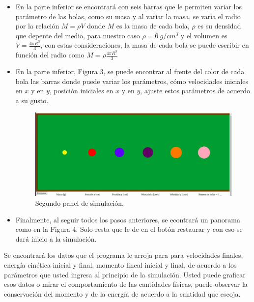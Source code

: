 \documentclass{article}
\begin{document}
\begin{itemize}
   
    \item En la parte inferior se encontrará con seis barras que le permiten variar los parámetro de las bolas, como su masa y al variar la masa, se varía el radio por la relación $M = \rho V $ donde $M$ es la masa de cada bola, $\rho$ es su densidad que depente del medio, para nuestro caso $\rho = 6\ g/cm^{3}$ y el volumen es $V = \frac{4\pi R^{3}}{3}$, con estas consideraciones, la masa de cada bola se puede escribir en función del radio como $M = \rho \frac{4\pi R^{3}}{3}$
    \item En la parte inferior, Figura 3, se puede encontrar al frente del color de cada bola las barras donde puede variar los parámetros, cómo velocidades iniciales en $x$ y en $y$, posición iniciales en $x$ y en $y$, ajuste estos parámetros de acuerdo a su gusto.
     \begin{figure}[h]
\includegraphics[width=\linewidth]{lab3.jpeg}
\caption{Segundo panel de simulación.}
\end{figure}

    \item Finalmente, al seguir todos los pasos anteriores, se econtrará un panorama como en la Figura 4. Solo resta que le de en el botón restaurar y con eso se dará inicio a la simulación.
\end{itemize}
Se encontrará los datos que el programa le arroja para para velocidades finales, energía cinética inicial y final, momento lineal inicial y final, de acuerdo a los parámetros que usted ingresa al principio de la simulación. Usted puede graficar esos datos o mirar el comportamiento de las cantidades físicas, puede observar la conservación del momento y de la energía de acuerdo a la cantidad que escoja.
\end{document}
